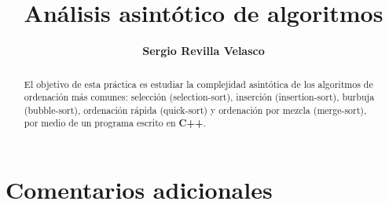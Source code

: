 

\title{\huge{\textbf{Análisis asintótico de algoritmos}}}
\author{\large{\textbf{Sergio Revilla Velasco}}}
\date{}


\maketitle


\begin{abstract}
El objetivo de esta práctica es estudiar la complejidad asintótica de los algoritmos de ordenación más comunes: selección (selection-sort), inserción (insertion-sort), burbuja (bubble-sort), ordenación rápida (quick-sort) y ordenación por mezcla (merge-sort), por medio de un programa escrito en \textbf{C++}.
\end{abstract}


\tableofcontents{}




\section{Comentarios adicionales}





